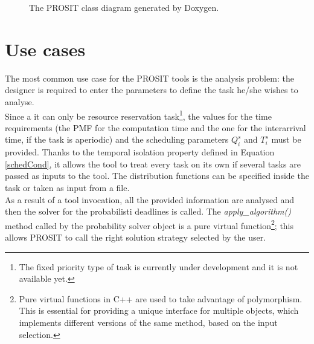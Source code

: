 \begin{figure}[H]
  \caption{The PROSIT class diagram generated by Doxygen.}
  \label{automaton}
\end{figure}

\section{Use cases}
% 
%
The most common use case for the PROSIT tools is the analysis problem: the designer is required to enter the parameters to define the task he/she wishes to analyse.\\
Since a it can only be resource reservation task\footnote{The fixed priority type of task is currently under development and it is not available yet.}, the values for the time requirements (the PMF for the computation time and the one for the interarrival time, if the task is aperiodic) and the scheduling parameters \( Q_{i}^s \) and \( T_{i}^s \) must be provided. Thanks to the temporal isolation property defined in Equation \ref{schedCond}, it allows the tool to treat every task on its own if several tasks are passed as inputs to the tool. The distribution functions can be specified inside the task or taken as input from a file.\\
As a result of a tool invocation, all the provided information are analysed and then the solver for the probabilisti deadlines is called. The \emph{apply\_algorithm()} method called by the probability solver object is a pure virtual function\footnote{Pure virtual functions in C++ are used to take advantage of polymorphism. This is essential for providing a unique interface for multiple objects, which implements different versions of the same method, based on the input selection.}; this allows PROSIT to call the right solution strategy selected by the user.  